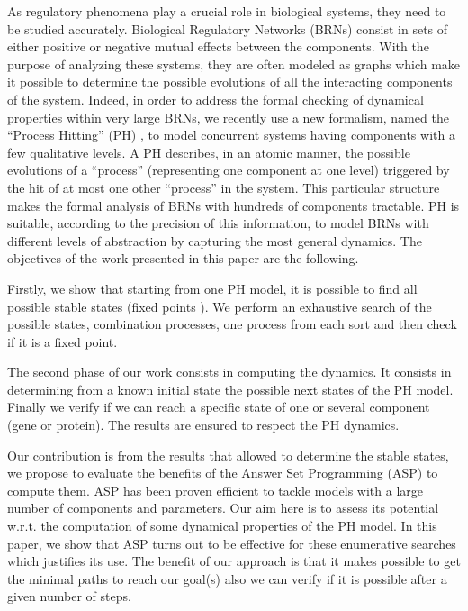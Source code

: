 As regulatory phenomena play a crucial role in biological systems, they need to
be studied accurately. Biological Regulatory Networks (BRNs) consist in sets
of either positive or negative mutual effects between the components. With the
purpose of analyzing these systems, they are often modeled as graphs which make
it possible to determine the possible evolutions of all the interacting components of the system. Indeed, in order to address the formal checking of dynamical properties within very large BRNs, we recently use a new formalism, named the “Process Hitting” (PH) \cite{pauleve2011modelisation}, to model concurrent systems having components with a few qualitative levels. A PH describes, in an atomic manner, the possible evolutions of a “process” (representing one component at one level) triggered by the hit of at most one other “process” in the system. This particular structure makes the formal analysis of BRNs with hundreds of components tractable. PH is suitable, according to the precision of this information, to model BRNs with different levels of abstraction by capturing the most general dynamics.
The objectives of the work presented in this paper are the following. 

Firstly, we show that starting from one PH model, it is possible to find all possible stable states (fixed points \cite{wuensche1998genomic}).
We perform an exhaustive search of the possible states, combination processes, one process from each sort and then check if it is a fixed point.

The second phase of our work consists in computing the dynamics. It consists in determining from a known initial state the possible next states of the PH model. Finally we verify if we can reach a specific state of one or several component (gene or protein). The results are ensured to respect the PH dynamics.

Our contribution is from the results that allowed to determine the stable states, we propose to evaluate the benefits of the Answer Set Programming (ASP) \cite{baral2003knowledge} to compute them. ASP has been proven efficient to tackle models with a large number of components and parameters. Our aim here is to assess its potential w.r.t. the computation of some dynamical properties of the PH model. In this paper, we show that ASP turns out to be effective for these enumerative searches which justifies its use. The benefit of our approach is that it makes possible to get the minimal paths to reach our goal(s) also we can verify if it is possible after a given number of steps. %
